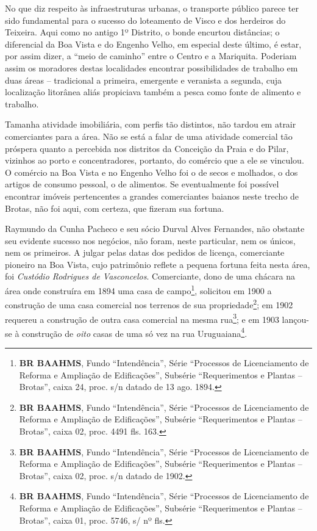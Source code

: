 



No que diz respeito às infraestruturas urbanas, o transporte público parece ter sido fundamental para o sucesso do loteamento de Visco e dos herdeiros do Teixeira. Aqui como no antigo 1º Distrito, o bonde encurtou distâncias; o diferencial da Boa Vista e do Engenho Velho, em especial deste último, é estar, por assim dizer, a ``meio de caminho'' entre o Centro e a Mariquita. Poderiam assim os moradores destas localidades encontrar possibilidades de trabalho em duas áreas -- tradicional a primeira, emergente e veranista a segunda, cuja localização litorânea aliás propiciava também a pesca como fonte de alimento e trabalho.


Tamanha atividade imobiliária, com perfis tão distintos, não tardou em atrair comerciantes para a área. Não se está a falar de uma atividade comercial tão próspera quanto a percebida nos distritos da Conceição da Praia e do Pilar, vizinhos ao porto e concentradores, portanto, do comércio que a ele se vinculou. O comércio na Boa Vista e no Engenho Velho foi o de secos e molhados, o dos artigos de consumo pessoal, o de alimentos. Se eventualmente foi possível encontrar imóveis pertencentes a grandes comerciantes baianos neste trecho de Brotas, não foi aqui, com certeza, que fizeram sua fortuna.

Raymundo da Cunha Pacheco e seu sócio Durval Alves Fernandes, não obstante seu evidente sucesso nos negócios, não foram, neste particular, nem os únicos, nem os primeiros. A julgar pelas datas dos pedidos de licença, comerciante pioneiro na Boa Vista, cujo patrimônio reflete a pequena fortuna feita nesta área, foi \textit{Custódio Rodrigues de Vasconcelos}. Comerciante, dono de uma chácara na área onde construíra em 1894 uma casa de campo\footnote{\textbf{BR BAAHMS}, Fundo ``Intendência'', Série ``Processos de Licenciamento de Reforma e Ampliação de Edificações'', Subsérie ``Requerimentos e Plantas -- Brotas'', caixa 24, proc. s/n datado de 13 ago. 1894.}, solicitou em 1900 a construção de uma casa comercial nos terrenos de sua propriedade\footnote{\textbf{BR BAAHMS}, Fundo ``Intendência'', Série ``Processos de Licenciamento de Reforma e Ampliação de Edificações'', Subsérie ``Requerimentos e Plantas -- Brotas'', caixa 02, proc. 4491 fls. 163.}; em 1902 requereu a construção de outra casa comercial na mesma rua\footnote{\textbf{BR BAAHMS}, Fundo ``Intendência'', Série ``Processos de Licenciamento de Reforma e Ampliação de Edificações'', Subsérie ``Requerimentos e Plantas -- Brotas'', caixa 02, proc. s/n datado de 1902.}; e em 1903 lançou-se à construção de \textit{oito} casas de uma só vez na rua Uruguaiana\footnote{\textbf{BR BAAHMS}, Fundo ``Intendência'', Série ``Processos de Licenciamento de Reforma e Ampliação de Edificações'', Subsérie ``Requerimentos e Plantas -- Brotas'', caixa 01, proc. 5746, s/ nº fls.}.

